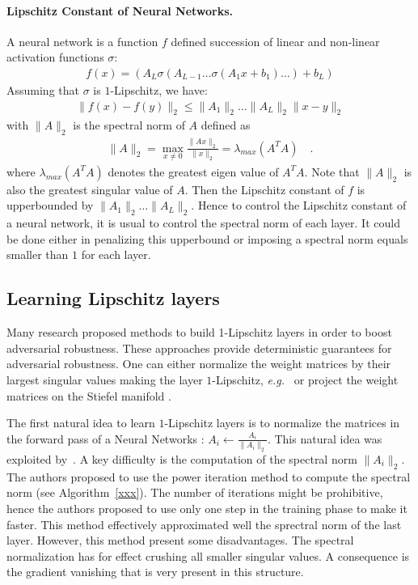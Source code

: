 \paragraph{Lipschitz Constant of Neural Networks.}  A neural network is a function $f$ defined succession of linear and non-linear activation functions $\sigma$:
\begin{align*}
  f(x) = \left(A_L\sigma\left(A_{L-1}\dots \sigma\left(A_1x+b_1\right)\dots\right)+b_L\right)
\end{align*}
Assuming that $\sigma$ is $1$-Lipschitz, we have:
\begin{align*}
  \lVert f(x)-f(y)\rVert_2\leq \lVert A_1\rVert_2\dots \lVert A_L\rVert_2\lVert x-y\rVert_2
\end{align*}
with $\lVert A\rVert_2$ is the spectral norm of $A$ defined as
\begin{align*}
  \lVert A\rVert_2 = \max_{x\neq 0} \frac{\lVert Ax\rVert_2}{\lVert x\rVert_2} = \lambda_{max}(A^TA)\quad.
\end{align*}
where $\lambda_{max}(A^TA)$ denotes the greatest eigen value of $A^TA$. Note that $\lVert A\rVert_2$ is also the greatest singular value of $A$.  
Then the Lipschitz constant of $f$ is upperbounded by $\lVert A_1\rVert_2\dots \lVert A_L\rVert_2$. Hence to control the Lipschitz constant of a neural network, it is usual to control the spectral norm of each layer. It could be done either in penalizing this upperbound or imposing a spectral norm equals smaller than $1$ for each layer. 

\subsection{Learning Lipschitz layers}

Many research proposed methods to build 1-Lipschitz layers in order to boost adversarial robustness. These approaches provide deterministic guarantees for adversarial robustness. One can either normalize the weight matrices by their largest singular values making the layer $1$-Lipschitz, \emph{e.g.}~\citep{yoshida2017spectral,miyato2018spectral,farnia2018generalizable,anil2019sorting} or project the weight matrices on the Stiefel manifold \citep{li2019preventing,trockman2021orthogonalizing,skew2021sahil}.

The first natural idea to learn $1$-Lipschitz layers is to normalize the matrices in the forward pass of a Neural Networks : $A_i\leftarrow \frac{A_i}{\lVert A_i\rVert_2}$. This natural idea was exploited by~\citet{miyato2018spectral}. A key difficulty is the computation of the spectral norm $\lVert A_i\rVert_2$. The authors proposed to use the power iteration method to compute the spectral norm (see Algorithm~\ref{xxx}). The number of iterations might be prohibitive, hence the authors proposed to use only one step in the training phase to make it faster. This method effectively approximated well the sprectral norm of the last layer. However, this method present some disadvantages. The spectral normalization has for effect crushing all smaller singular values. A consequence is the gradient vanishing that is very present in this structure. 

